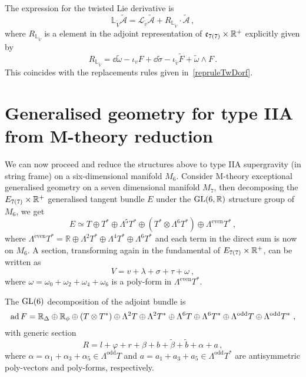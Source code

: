 \documentclass[debug]{phd}
\begin{document}
				The expression for the twisted Lie derivative is
						\begin{equation}
							\mathbb{L}_{\tilde{V}} \tilde{\mathcal{A}} = \mathcal{L}_{\tilde{v}} \tilde{\mathcal{A}} + R_{ \mathbb{L}_{\tilde{V}} } \cdot \tilde{\mathcal{A}} \, ,
						\end{equation}
				where $R_{ \mathbb{L}_{\tilde{V}} }$ is a element in the adjoint representation of $\mathfrak{e}_{7(7)}\times \mathbb{R}^+$ explicitly given by
						\begin{equation}
							R_{ \mathbb{L}_{\tilde{V}} } = \dd \tilde{\omega} - \iota_{v} F + \dd \tilde{\sigma} - \iota_{\tilde{v}} \tilde{F} +\tilde{\omega} \wedge F \, .
						\end{equation}
				This coincides with the replacements rules given in~\eqref{repruleTwDorf}.
		\section{Generalised geometry for type IIA from M-theory reduction}\label{appsec:EGGIIA}
			We can now proceed and reduce the structures above to type IIA supergravity (in string frame) on a six-dimensional manifold $M_6$.
			Consider M-theory exceptional generalised geometry on a seven dimensional manifold $M_7$, then decomposing the $E_{7(7)}\times \mathbb{R}^+$ generalised tangent bundle $E$ under the $\mathrm{GL}(6, \mathbb{R})$ structure group of $M_6$, we get 
					\begin{equation}\label{app:gentb}
						E \simeq T \oplus T^* \oplus \Lambda^5 T^*\oplus (T^* \otimes \Lambda^6 T^*) \oplus \Lambda^\mathrm{even}T^* \, ,
					\end{equation}
			where $\Lambda^{\mathrm{even}}T^*=\mathbb{R} \oplus \Lambda^2 T^* \oplus \Lambda^4 T^* \oplus \Lambda^6 T^*$ and each term in the direct sum is now on $M_6$. 
			A section, transforming again in the fundamental of $E_{7(7)}\times \mathbb{R}^+$, can be written as
					\begin{equation}\label{app:genvec}	
						V = v + \lambda + \sigma + \tau + \omega\ ,
					\end{equation}
			where $\omega=\omega_0 + \omega_2 + \omega_4 + \omega_6$ is a poly-form in $ \Lambda^{\mathrm{even}} T^*$.

			The $\mathrm{GL}(6)$ decomposition of the adjoint bundle is
					\begin{equation}
					\operatorname{ad} F = \mathbb{R}_\Delta \oplus \mathbb{R}_\phi \oplus (T\otimes T^*) \oplus \Lambda^2 T \oplus \Lambda^2 T^*	\oplus \Lambda^6 T \oplus \Lambda^6 T^* \oplus \Lambda^{\mathrm{odd}} T \oplus 												\Lambda^{\mathrm{odd}} T^*\ ,
					\end{equation}
			with generic section
					\begin{equation}\label{Edd_adjoint}
						R = l + \varphi + r + \beta + b + \tilde \beta + \tilde b + \alpha + a \, ,
					\end{equation}
			where $\alpha = \alpha_1 + \alpha_3 + \alpha_5 \in \Lambda^{\mathrm{odd}} T$ and $a= a_1 + a_3 + a_5 \in \Lambda^{\mathrm{odd}} T^*$ are antisymmetric poly-vectors and poly-forms, respectively. 
\end{document}
